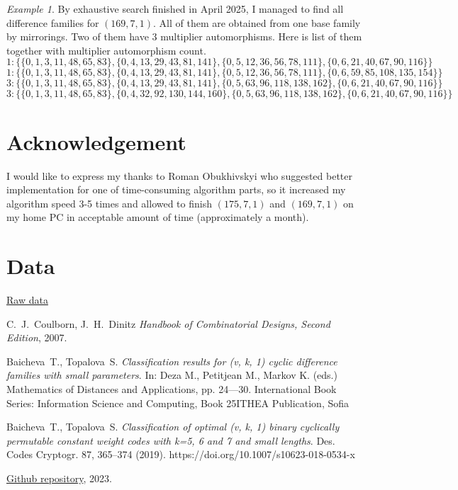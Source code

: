 \documentclass{amsart}
\theoremstyle{plain}
\theoremstyle{definition}
\theoremstyle{remark}
\newtheorem{example}{Example}[section]
\begin{document}
\begin{example} By exhaustive search finished in April 2025, I managed to find all difference families for $(169,7,1)$. All of them are obtained from one base family by mirrorings. Two of them have 3 multiplier automorphisms. Here is list of them together with multiplier automorphism count.
$$1: \{\{0, 1, 3, 11, 48, 65, 83\}, \{0, 4, 13, 29, 43, 81, 141\}, \{0, 5, 12, 36, 56, 78, 111\}, \{0, 6, 21, 40, 67, 90, 116\}\}$$
$$1: \{\{0, 1, 3, 11, 48, 65, 83\}, \{0, 4, 13, 29, 43, 81, 141\}, \{0, 5, 12, 36, 56, 78, 111\}, \{0, 6, 59, 85, 108, 135, 154\}\}$$
$$3: \{\{0, 1, 3, 11, 48, 65, 83\}, \{0, 4, 13, 29, 43, 81, 141\}, \{0, 5, 63, 96, 118, 138, 162\}, \{0, 6, 21, 40, 67, 90, 116\}\}$$
$$3: \{\{0, 1, 3, 11, 48, 65, 83\}, \{0, 4, 32, 92, 130, 144, 160\}, \{0, 5, 63, 96, 118, 138, 162\}, \{0, 6, 21, 40, 67, 90, 116\}\}$$
\end{example}

\section{Acknowledgement}

I would like to express my thanks to Roman Obukhivskyi who suggested better implementation for one of time-consuming algorithm parts, so it increased my algorithm speed 3-5 times and allowed to finish $(175,7,1)$ and $(169,7,1)$ on my home PC in acceptable amount of time (approximately a month).

\section{Data}

\href{data/151-6.txt}{Raw data}

\begin{thebibliography}{}

 C.~J.~Coulborn, J.~H.~Dinitz {\em Handbook of Combinatorial Designs, Second Edition}, 2007.

 Baicheva~T., Topalova~S. {\em Classification results for (v, k, 1) cyclic difference families with small parameters}. In: Deza M., Petitjean M., Markov K. (eds.) Mathematics of Distances and Applications, pp. 24---30. International Book Series: Information Science and Computing, Book 25ITHEA Publication, Sofia

 Baicheva~T., Topalova~S. {\em Classification of optimal (v, k, 1) binary cyclically permutable constant weight codes with k=5, 6 and 7 and small lengths}. Des. Codes Cryptogr. 87, 365–374 (2019). https://doi.org/10.1007/s10623-018-0534-x

 \href{https://github.com/Ihromant/math-utils/blob/44bf2c6964a4f70c3349859b6b75ef2fe486ab7a/src/test/java/ua/ihromant/mathutils/BibdFinder1Test.java}{Github repository}, 2023.

\end{thebibliography}
\end{document}

